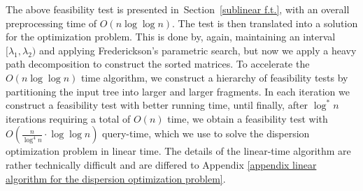 \documentclass[a4paper,UKenglish]{lipics-v2016}
\theoremstyle{plain}
\begin{document}
The above feasibility test is presented in~Section~\ref{sublinear f.t.}, with an overall preprocessing time of $O(n\log\log n)$.
The test is then translated into a solution for the optimization problem. This is done by, again, maintaining an interval
$[\lambda_{1},\lambda_{2})$ and applying Frederickson's parametric search, but now we apply a heavy path decomposition to construct
the sorted matrices.
To accelerate the $O(n\log\log n)$ time algorithm, we construct a hierarchy of feasibility tests by partitioning the input tree
into larger and larger fragments. In each iteration we construct a feasibility test with better running time, until finally, after $\log ^*n$ iterations requiring a total of $O(n)$ time, we obtain a feasibility test with $O(\frac{n}{\log ^4n} \cdot \log \log n)$ query-time, which we use to solve the dispersion optimization problem in linear  time. The details of the linear-time algorithm are rather technically difficult and are differed to Appendix \ref{appendix linear algorithm for the dispersion optimization problem}.
\end{document}
